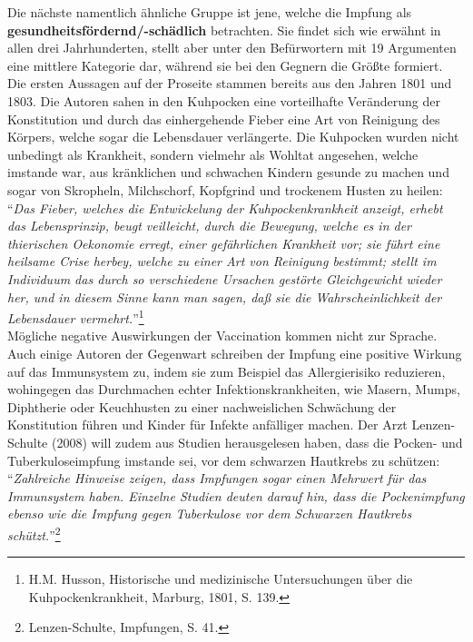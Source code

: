 \documentclass[
    a4paper,
    12pt,
    hyphens,
    chapterprefix=true,
    headheight=33pt,
    footheight=29pt,
    headings=optiontohead, %
]{scrartcl}
\begin{document}
{Die nächste namentlich ähnliche Gruppe ist jene, welche die Impfung als \textbf{gesundheitsfördernd/-schädlich} betrachten. Sie findet sich wie erwähnt in allen drei Jahrhunderten, stellt aber unter den Befürwortern mit 19 Argumenten eine mittlere Kategorie dar, während sie bei den Gegnern die Größte formiert. Die ersten Aussagen auf der Proseite stammen bereits aus den Jahren 1801 und 1803. Die Autoren sahen in den Kuhpocken eine vorteilhafte Veränderung der Konstitution und durch das einhergehende Fieber eine Art von Reinigung des Körpers, welche sogar die Lebensdauer verlängerte. Die Kuhpocken wurden nicht unbedingt als Krankheit, sondern vielmehr als Wohltat angesehen, welche imstande war, aus kränklichen und schwachen Kindern gesunde zu machen und sogar von Skropheln, Milchschorf, Kopfgrind und trockenem Husten zu heilen: "`\textit{Das Fieber, welches die Entwickelung der Kuhpockenkrankheit anzeigt, erhebt das Lebensprinzip, beugt veilleicht, durch die Bewegung, welche es in der thierischen Oekonomie erregt, einer gefährlichen Krankheit vor; sie führt eine heilsame Crise herbey, welche zu einer Art von Reinigung bestimmt; stellt im Individuum das durch so verschiedene Ursachen gestörte Gleichgewicht wieder her, und in diesem Sinne kann man sagen, daß sie die Wahrscheinlichkeit der Lebensdauer vermehrt.}"'\footnote{H.M. Husson, Historische und medizinische Untersuchungen über die Kuhpockenkrankheit, Marburg, 1801,  S. 139.}\\
Mögliche negative Auswirkungen der Vaccination kommen nicht zur Sprache. Auch einige Autoren der Gegenwart schreiben der Impfung eine positive Wirkung auf das Immunsystem zu, indem sie zum Beispiel das Allergierisiko reduzieren, wohingegen das Durchmachen echter Infektionskrankheiten, wie Masern, Mumps, Diphtherie oder Keuchhusten zu einer nachweislichen Schwächung der Konstitution führen und Kinder für Infekte anfälliger machen. Der Arzt Lenzen-Schulte (2008) will zudem aus Studien herausgelesen haben, dass die Pocken- und Tuberkuloseimpfung imstande sei, vor dem schwarzen Hautkrebs zu schützen: "`\textit{Zahlreiche Hinweise zeigen, dass Impfungen sogar einen Mehrwert für das Immunsystem haben. Einzelne Studien deuten darauf hin, dass die Pockenimpfung ebenso wie die Impfung gegen Tuberkulose vor dem Schwarzen Hautkrebs schützt.}"'\footnote{Lenzen-Schulte, Impfungen, S. 41.}\\
}
\end{document}
